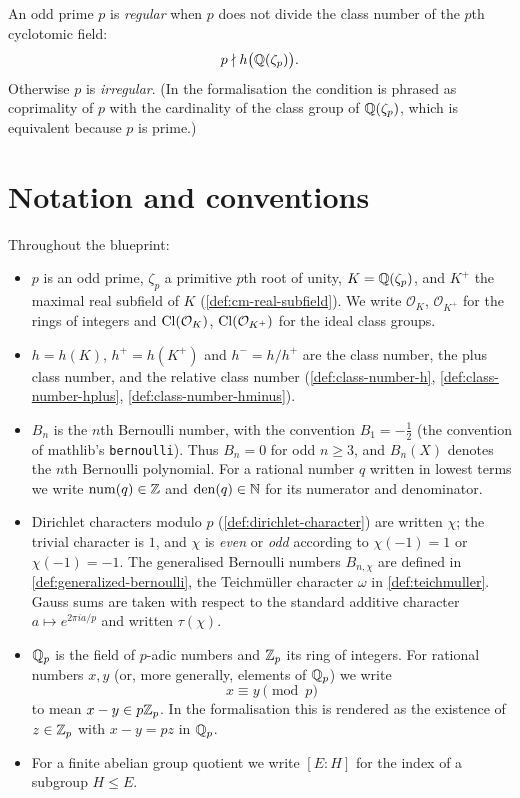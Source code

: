 \begin{definition}\label{def:regular-prime}
  \leanok
An odd prime $p$ is \emph{regular} when $p$ does not divide the class
number of the $p$th cyclotomic field:
\[
  p \nmid h\bigl(\mathbb{Q}(\zeta_p)\bigr).
\]
Otherwise $p$ is \emph{irregular}.  (In the formalisation the condition is
phrased as coprimality of $p$ with the cardinality of the class group of
$\mathbb{Q}(\zeta_p)$, which is equivalent because $p$ is prime.)
\end{definition}

\section{Notation and conventions}

Throughout the blueprint:

\begin{itemize}
\item $p$ is an odd prime, $\zeta_p$ a primitive $p$th root of unity,
  $K = \mathbb{Q}(\zeta_p)$, and $K^+$ the maximal real subfield of $K$
  (\cref{def:cm-real-subfield}).  We write $\mathcal O_K$, $\mathcal
  O_{K^+}$ for the rings of integers and $\mathrm{Cl}(\mathcal O_K)$,
  $\mathrm{Cl}(\mathcal O_{K^+})$ for the ideal class groups.
\item $h = h(K)$, $h^+ = h(K^+)$ and $h^- = h/h^+$ are the class number,
  the plus class number, and the relative class number
  (\cref{def:class-number-h}, \cref{def:class-number-hplus},
  \cref{def:class-number-hminus}).
\item $B_n$ is the $n$th Bernoulli number, with the convention
  $B_1 = -\tfrac12$ (the convention of mathlib's \texttt{bernoulli}).
  Thus $B_n = 0$ for odd $n \ge 3$, and $B_n(X)$ denotes the $n$th
  Bernoulli polynomial.  For a rational number $q$ written in lowest terms
  we write $\operatorname{num}(q) \in \mathbb{Z}$ and $\operatorname{den}(q) \in
  \mathbb{N}$ for its numerator and denominator.
\item Dirichlet characters modulo $p$ (\cref{def:dirichlet-character}) are
  written $\chi$; the trivial character is $1$, and $\chi$ is \emph{even}
  or \emph{odd} according to $\chi(-1) = 1$ or $\chi(-1) = -1$.  The
  generalised Bernoulli numbers $B_{n,\chi}$ are defined in
  \cref{def:generalized-bernoulli}, the Teichm\"uller character $\omega$ in
  \cref{def:teichmuller}.  Gauss sums are taken with respect to the
  standard additive character $a \mapsto e^{2\pi i a/p}$ and written
  $\tau(\chi)$.
\item $\mathbb{Q}_p$ is the field of $p$-adic numbers and $\mathbb{Z}_p$ its ring of
  integers.  For rational numbers $x, y$ (or, more generally, elements of
  $\mathbb{Q}_p$) we write
  \[
    x \equiv y \pmod{p}
  \]
  to mean $x - y \in p\mathbb{Z}_p$.  In the formalisation this is rendered as the
  existence of $z \in \mathbb{Z}_p$ with $x - y = pz$ in $\mathbb{Q}_p$.
\item For a finite abelian group quotient we write $[E : H]$ for the index
  of a subgroup $H \le E$.
\end{itemize}

